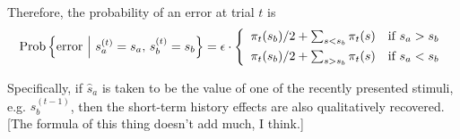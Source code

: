 \documentclass[aps,pre,reprint,onecolumn,notitlepage,superscriptaddress,nofootinbib]{revtex4-2}
\DeclareMathOperator*{\prob}{Prob}
\begin{document}
	Therefore, the probability of an error at trial $t$ is
	\begin{equation}\label{eq:perf-game}
		\prob\Big\{{\rm error}\ \Big|\ s_a^{(t)}=s_a,\,s_b^{(t)}=s_b \Big\} = \epsilon \cdot
		\left\{
			\begin{array}{cl}
				\pi_t(s_b)/2 + \sum_{s < s_b} \pi_t(s) & \mbox{if } s_a > s_b \\[1ex]
				\pi_t(s_b)/2 + \sum_{s > s_b} \pi_t(s) & \mbox{if } s_a < s_b
			\end{array}
		\right.
	\end{equation}

	Specifically, if $\hat{s}_a$ is taken to be the value of one of the recently presented stimuli, e.g. $s_b^{(t-1)}$, then the short-term history effects are also qualitatively recovered.
	{\color{red}[The formula of this thing doesn't add much, I think.]}



	
\end{document}
